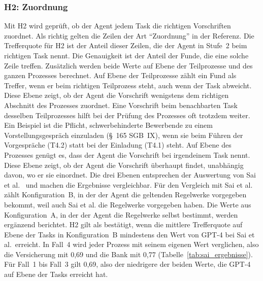 \subsubsection{H2: Zuordnung}
Mit H2 wird geprüft, ob der Agent jedem Task die richtigen Vorschriften zuordnet.
Als richtig gelten die Zeilen der Art \enquote{Zuordnung} in der Referenz.
Die Trefferquote für H2 ist der Anteil dieser Zeilen, die der Agent in Stufe~2 beim richtigen Task nennt.
Die Genauigkeit ist der Anteil der Funde, die eine solche Zeile treffen.
Zusätzlich werden beide Werte auf Ebene der Teilprozesse und des ganzen Prozesses berechnet.
Auf Ebene der Teilprozesse zählt ein Fund als Treffer, wenn er beim richtigen Teilprozess steht, auch wenn der Task abweicht.
Diese Ebene zeigt, ob der Agent die Vorschrift wenigstens dem richtigen Abschnitt des Prozesses zuordnet.
Eine Vorschrift beim benachbarten Task desselben Teilprozesses hilft bei der Prüfung des Prozesses oft trotzdem weiter.
Ein Beispiel ist die Pflicht, schwerbehinderte Bewerbende zu einem Vorstellungsgespräch einzuladen (§~165 SGB~IX), wenn sie beim Führen der Vorgespräche (T4.2) statt bei der Einladung (T4.1) steht.
Auf Ebene des Prozesses genügt es, dass der Agent die Vorschrift bei irgendeinem Task nennt.
Diese Ebene zeigt, ob der Agent die Vorschrift überhaupt findet, unabhängig davon, wo er sie einordnet.
Die drei Ebenen entsprechen der Auswertung von Sai et al.~\cite{sai2024} und machen die Ergebnisse vergleichbar.
Für den Vergleich mit Sai et al. zählt Konfiguration~B, in der der Agent die geltenden Regelwerke vorgegeben bekommt, weil auch Sai et al. die Regelwerke vorgegeben haben.
Die Werte aus Konfiguration~A, in der der Agent die Regelwerke selbst bestimmt, werden ergänzend berichtet.
H2 gilt als bestätigt, wenn die mittlere Trefferquote auf Ebene der Tasks in Konfiguration~B mindestens den Wert von GPT-4 bei Sai et al.\ erreicht.
In Fall~4 wird jeder Prozess mit seinem eigenen Wert verglichen, also die Versicherung mit 0,69 und die Bank mit 0,77 (Tabelle~\ref{tab:sai_ergebnisse}).
Für Fall~1 bis Fall~3 gilt 0,69, also der niedrigere der beiden Werte, die GPT-4 auf Ebene der Tasks erreicht hat.
